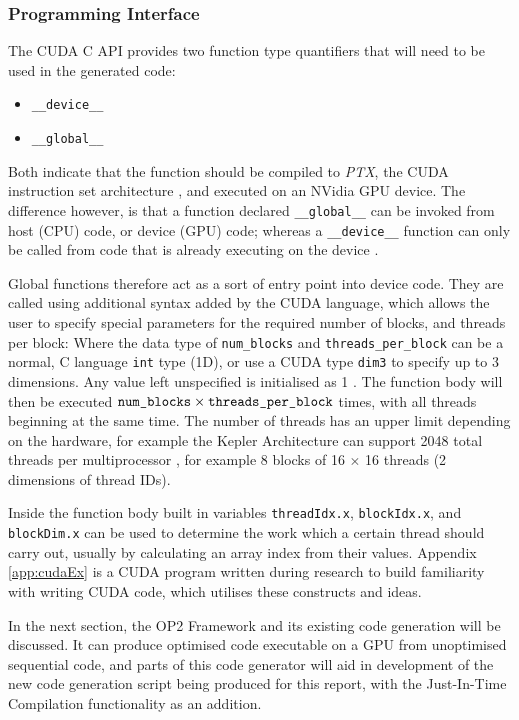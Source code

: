 \subsubsection{Programming Interface}
The CUDA C API provides two function type quantifiers that will need to be used in the generated code:
\begin{itemize}
\vspace{-.5cm}
\setlength{\itemsep}{0pt}%
\setlength{\parskip}{0pt}%
\item{\verb|__device__|}
\item{\verb|__global__|}
\vspace{-.5cm}
\end{itemize}
Both indicate that the function should be compiled to \textit{PTX}, the CUDA instruction set architecture \cite[p15]{guide}, and executed on an NVidia GPU device. The difference however, is that a function declared \verb|__global__| can be invoked from host (CPU) code, or device (GPU) code; whereas a \verb|__device__| function can only be called from code that is already executing on the device \cite[p81]{guide}.
\par
Global functions therefore act as a sort of entry point into device code. They are called using additional syntax added by the CUDA language, which allows the user to specify special parameters for the required number of blocks, and threads per block:
\noindent Where the data type of \verb|num_blocks| and \verb|threads_per_block| can be a normal, C language \verb|int| type (1D), or use a CUDA type \verb|dim3| \cite[p9]{guide} to specify up to 3 dimensions. Any value left unspecified is initialised as 1 \cite[p87]{guide}. The function body will then be executed $\verb|num_blocks| \times \verb|threads_per_block|$ times, with all threads beginning at the same time. The number of threads has an upper limit depending on the hardware, for example the Kepler Architecture can support 2048 total threads per multiprocessor \cite{kepler}, for example 8 blocks of 16 $\times$ 16 threads (2 dimensions of thread IDs).
\par
Inside the function body built in variables \verb|threadIdx.x|, \verb|blockIdx.x|, and \verb|blockDim.x| can be used to determine the work which a certain thread should carry out, usually by calculating an array index from their values. Appendix \ref{app:cudaEx} is a CUDA program written during research to build familiarity with writing CUDA code, which utilises these constructs and ideas.
\par
In the next section, the OP2 Framework and its existing code generation will be discussed. It can produce optimised code executable on a GPU from unoptimised sequential code, and parts of this code generator will aid in development of the new code generation script being produced for this report, with the Just-In-Time Compilation functionality as an addition.

